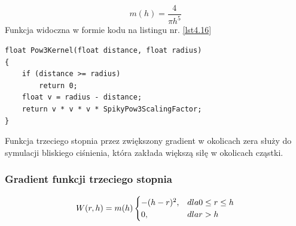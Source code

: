 \documentclass{article}
\begin{document}
\begin{center}
\newline
\caption{Rysunek 11: Funkcja ``ostra" trzeciego stopnia}
\label{functions_4}
\end{center}

\begin{equation}\label{eqn32}
m(h) = \frac{4}{\pi h^5}
\end{equation}
\newline
Funkcja widoczna w formie kodu na listingu nr. \ref{lst4.16}\newline

\begin{lstlisting}[caption=Funkcja ``ostra" trzeciego stopnia, label={lst4.16}]
float Pow3Kernel(float distance, float radius)
{
	if (distance >= radius)
        return 0;
	float v = radius - distance;
	return v * v * v * SpikyPow3ScalingFactor;
}
\end{lstlisting}
\noindent
Funkcja trzeciego stopnia przez zwiększony gradient w okolicach zera służy do symulacji bliskiego ciśnienia, która zakłada większą siłę w okolicach cząstki.\newline
\newpage
\subsubsection{Gradient funkcji trzeciego stopnia}
\begin{equation}\label{eqn33}
W(r,h) = m(h)
\begin{cases}
-(h-r)^2, & dla \space 0 \leq r \leq h\\
0, & dla \space r > h
\end{cases}
\end{equation}
\end{document}
